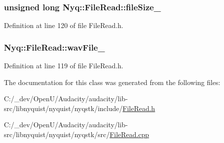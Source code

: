 \subsubsection[{\texorpdfstring{file\+Size\+\_\+}{fileSize_}}]{\setlength{\rightskip}{0pt plus 5cm}unsigned long Nyq\+::\+File\+Read\+::file\+Size\+\_\+\hspace{0.3cm}{\ttfamily [protected]}}\hypertarget{class_nyq_1_1_file_read_a0da2f6260e43658b06f9da9bd29d692d}{}\label{class_nyq_1_1_file_read_a0da2f6260e43658b06f9da9bd29d692d}


Definition at line 120 of file File\+Read.\+h.

\subsubsection[{\texorpdfstring{wav\+File\+\_\+}{wavFile_}}]{ Nyq\+::\+File\+Read\+::wav\+File\+\_\+\hspace{0.3cm}{\ttfamily [protected]}}\hypertarget{class_nyq_1_1_file_read_aaff2e8be9c74d5f03353e30268bee42d}{}\label{class_nyq_1_1_file_read_aaff2e8be9c74d5f03353e30268bee42d}


Definition at line 119 of file File\+Read.\+h.



The documentation for this class was generated from the following files\+:\begin{DoxyCompactItemize}
\item 
C\+:/\+\_\+dev/\+Open\+U/\+Audacity/audacity/lib-\/src/libnyquist/nyquist/nyqstk/include/\hyperlink{_file_read_8h}{File\+Read.\+h}\item 
C\+:/\+\_\+dev/\+Open\+U/\+Audacity/audacity/lib-\/src/libnyquist/nyquist/nyqstk/src/\hyperlink{_file_read_8cpp}{File\+Read.\+cpp}\end{DoxyCompactItemize}
